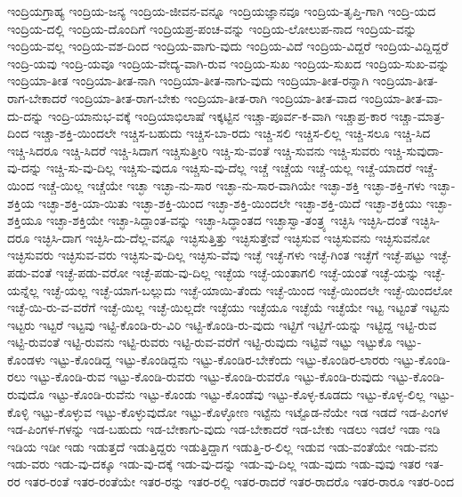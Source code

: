 {ಇಂದ್ರಿಯಗ್ರಾಹ್ಯ
ಇಂದ್ರಿಯ-ಜನ್ಯ
ಇಂದ್ರಿಯ-ಜೀವನ-ವನ್ನೂ
ಇಂದ್ರಿಯಜ್ಞಾನವೂ
ಇಂದ್ರಿಯ-ತೃಪ್ತಿ-ಗಾಗಿ
ಇಂದ್ರಿ-ಯದ
ಇಂದ್ರಿಯ-ದಲ್ಲಿ
ಇಂದ್ರಿಯ-ದೊಂದಿಗೆ
ಇಂದ್ರಿಯಪ್ರ-ಪಂಚ-ವನ್ನು
ಇಂದ್ರಿಯ-ಲೋಲುಪ-ನಾದ
ಇಂದ್ರಿಯ-ವನ್ನು
ಇಂದ್ರಿಯ-ವಲ್ಲ
ಇಂದ್ರಿಯ-ವಶ-ದಿಂದ
ಇಂದ್ರಿಯ-ವಾಗು-ವುದು
ಇಂದ್ರಿಯ-ವಿದೆ
ಇಂದ್ರಿಯ-ವಿದ್ದರೆ
ಇಂದ್ರಿಯ-ವಿದ್ದಿದ್ದರೆ
ಇಂದ್ರಿ-ಯವು
ಇಂದ್ರಿ-ಯವೂ
ಇಂದ್ರಿಯ-ವೇದ್ಯ-ವಾಗಿ-ರುವ
ಇಂದ್ರಿಯ-ಸುಖ
ಇಂದ್ರಿಯ-ಸುಖದ
ಇಂದ್ರಿಯ-ಸುಖ-ವನ್ನು
ಇಂದ್ರಿಯಾ-ತೀತ
ಇಂದ್ರಿಯಾ-ತೀತ-ನಾಗಿ
ಇಂದ್ರಿಯಾ-ತೀತ-ನಾಗು-ವುದು
ಇಂದ್ರಿಯಾ-ತೀತ-ರನ್ನಾಗಿ
ಇಂದ್ರಿಯಾ-ತೀತ-ರಾಗ-ಬೇಕಾದರೆ
ಇಂದ್ರಿಯಾ-ತೀತ-ರಾಗ-ಬೇಕು
ಇಂದ್ರಿಯಾ-ತೀತ-ರಾಗಿ
ಇಂದ್ರಿಯಾ-ತೀತ-ವಾದ
ಇಂದ್ರಿಯಾ-ತೀತ-ವಾ-ದು-ದನ್ನು
ಇಂದ್ರಿ-ಯಾನುಭ-ವಕ್ಕೆ
ಇಂದ್ರಿಯಾಭಿಲಾಷೆ
ಇಕ್ಕಟ್ಟಿನ
ಇಚ್ಚಾ-ಪೂರ್ವ-ಕ-ವಾಗಿ
ಇಚ್ಚಾಪ್ರ-ಕಾರ
ಇಚ್ಚಾ-ಮಾತ್ರ-ದಿಂದ
ಇಚ್ಚಾ-ಶಕ್ತಿ-ಯಿಂದಲೇ
ಇಚ್ಚಿಸ-ಬಹುದು
ಇಚ್ಚಿಸ-ಬಾ-ರದು
ಇಚ್ಚಿ-ಸಲಿ
ಇಚ್ಚಿಸ-ಲಿಲ್ಲ
ಇಚ್ಚಿ-ಸಲೂ
ಇಚ್ಚಿ-ಸಿದ
ಇಚ್ಚಿ-ಸಿದರೂ
ಇಚ್ಚಿ-ಸಿದರೆ
ಇಚ್ಚಿ-ಸಿದಾಗ
ಇಚ್ಚಿಸುತ್ತೀರಿ
ಇಚ್ಚಿ-ಸು-ವಂತೆ
ಇಚ್ಚಿ-ಸುವನು
ಇಚ್ಚಿ-ಸುವರು
ಇಚ್ಚಿ-ಸುವುದಾ-ವು-ದನ್ನು
ಇಚ್ಚಿ-ಸು-ವು-ದಿಲ್ಲ
ಇಚ್ಚಿಸು-ವುದೂ
ಇಚ್ಚಿಸು-ವು-ದೆಲ್ಲ
ಇಚ್ಚೆ
ಇಚ್ಚೆಯ
ಇಚ್ಚೆ-ಯಲ್ಲ
ಇಚ್ಚೆ-ಯಾದರೆ
ಇಚ್ಚೆ-ಯಿಂದ
ಇಚ್ಚೆ-ಯಿಲ್ಲ
ಇಚ್ಚೆಯೇ
ಇಚ್ಛಾ
ಇಚ್ಛಾ-ನು-ಸಾರ
ಇಚ್ಛಾ-ನು-ಸಾರ-ವಾಗಿಯೇ
ಇಚ್ಛಾ-ಶಕ್ತಿ
ಇಚ್ಛಾ-ಶಕ್ತಿ-ಗಳು
ಇಚ್ಛಾ-ಶಕ್ತಿಯ
ಇಚ್ಛಾ-ಶಕ್ತಿ-ಯಾ-ಯಿತು
ಇಚ್ಛಾ-ಶಕ್ತಿ-ಯಿಂದ
ಇಚ್ಛಾ-ಶಕ್ತಿ-ಯಿಂದಲೇ
ಇಚ್ಛಾ-ಶಕ್ತಿ-ಯಿದೆ
ಇಚ್ಛಾ-ಶಕ್ತಿಯು
ಇಚ್ಛಾ-ಶಕ್ತಿಯೂ
ಇಚ್ಛಾ-ಶಕ್ತಿಯೇ
ಇಚ್ಛಾ-ಸಿದ್ದಾಂತ-ವನ್ನು
ಇಚ್ಛಾ-ಸಿದ್ಧಾಂತದ
ಇಚ್ಛಾಸ್ವಾ-ತಂತ್ರ್ಯ
ಇಚ್ಛಿಸಿ
ಇಚ್ಛಿಸಿ-ದಂತೆ
ಇಚ್ಛಿಸಿ-ದರೂ
ಇಚ್ಛಿಸಿ-ದಾಗ
ಇಚ್ಛಿಸಿ-ದು-ದೆಲ್ಲ-ವನ್ನೂ
ಇಚ್ಛಿಸುತ್ತಿತ್ತು
ಇಚ್ಛಿಸುತ್ತೇವೆ
ಇಚ್ಛಿಸುವ
ಇಚ್ಛಿಸುವನು
ಇಚ್ಛಿಸುವನೋ
ಇಚ್ಛಿಸುವರು
ಇಚ್ಛಿಸುವ-ವರು
ಇಚ್ಛಿಸು-ವು-ದಿಲ್ಲ
ಇಚ್ಛಿಸು-ವೆವು
ಇಚ್ಛೆ
ಇಚ್ಛೆ-ಗಳು
ಇಚ್ಛೆ-ಗಿಂತ
ಇಚ್ಛೆಗೆ
ಇಚ್ಛೆ-ಪಟ್ಟು
ಇಚ್ಛೆ-ಪಡು-ವಂತೆ
ಇಚ್ಛೆ-ಪಡು-ವರೋ
ಇಚ್ಛೆ-ಪಡು-ವು-ದಿಲ್ಲ
ಇಚ್ಛೆಯ
ಇಚ್ಛೆ-ಯಂತಾಗಲಿ
ಇಚ್ಛೆ-ಯಂತೆ
ಇಚ್ಛೆ-ಯನ್ನು
ಇಚ್ಛೆ-ಯನ್ನೆಲ್ಲ
ಇಚ್ಛೆ-ಯಲ್ಲ
ಇಚ್ಛೆ-ಯಾಗ-ಬಲ್ಲುದು
ಇಚ್ಛೆ-ಯಾಯಿ-ತೆಂದು
ಇಚ್ಛೆ-ಯಿಂದ
ಇಚ್ಛೆ-ಯಿಂದಲೇ
ಇಚ್ಛೆ-ಯಿಂದಲೋ
ಇಚ್ಛೆ-ಯಿ-ರು-ವ-ವರೆಗೆ
ಇಚ್ಛೆ-ಯಿಲ್ಲ
ಇಚ್ಛೆ-ಯಿಲ್ಲದೇ
ಇಚ್ಛೆಯು
ಇಚ್ಛೆಯೂ
ಇಚ್ಛೆಯೆ
ಇಚ್ಛೆಯೇ
ಇಟ್ಟ
ಇಟ್ಟಂತೆ
ಇಟ್ಟನು
ಇಟ್ಟರು
ಇಟ್ಟರೆ
ಇಟ್ಟವು
ಇಟ್ಟಿ-ಕೊಂಡಿ-ರು-ವಿರಿ
ಇಟ್ಟಿ-ಕೊಂಡಿ-ರು-ವುದು
ಇಟ್ಟಿಗೆ
ಇಟ್ಟಿಗೆ-ಯನ್ನು
ಇಟ್ಟಿದ್ದ
ಇಟ್ಟಿ-ರುವ
ಇಟ್ಟಿ-ರುವಂತೆ
ಇಟ್ಟಿ-ರುವನು
ಇಟ್ಟಿ-ರುವರು
ಇಟ್ಟಿ-ರುವ-ವರೆಗೆ
ಇಟ್ಟಿ-ರುವುದು
ಇಟ್ಟಿವೆ
ಇಟ್ಟು
ಇಟ್ಟುಕೊ
ಇಟ್ಟು-ಕೊಂಡಳು
ಇಟ್ಟು-ಕೊಂಡಿದ್ದ
ಇಟ್ಟು-ಕೊಂಡಿದ್ದನು
ಇಟ್ಟು-ಕೊಂಡಿರ-ಬೇಕೆಂದು
ಇಟ್ಟು-ಕೊಂಡಿರ-ಲಾರರು
ಇಟ್ಟು-ಕೊಂಡಿ-ರಲು
ಇಟ್ಟು-ಕೊಂಡಿ-ರುವ
ಇಟ್ಟು-ಕೊಂಡಿ-ರುವರು
ಇಟ್ಟು-ಕೊಂಡಿ-ರುವರೊ
ಇಟ್ಟು-ಕೊಂಡಿ-ರುವುದು
ಇಟ್ಟು-ಕೊಂಡಿ-ರುವುದೊ
ಇಟ್ಟು-ಕೊಂಡಿ-ರುವೆನು
ಇಟ್ಟು-ಕೊಂಡು
ಇಟ್ಟು-ಕೊಂಡೆವು
ಇಟ್ಟು-ಕೊಳ್ಳ-ಕೂಡದು
ಇಟ್ಟು-ಕೊಳ್ಳ-ಲಿಲ್ಲ
ಇಟ್ಟು-ಕೊಳ್ಳಿ
ಇಟ್ಟು-ಕೊಳ್ಳುವ
ಇಟ್ಟು-ಕೊಳ್ಳುವುದೋ
ಇಟ್ಟು-ಕೊಳ್ಳೋಣ
ಇಟ್ಟೆನು
ಇಟ್ಟೊಡ-ನೆಯೇ
ಇಡ
ಇಡದೆ
ಇಡ-ಪಿಂಗಳ
ಇಡ-ಪಿಂಗಳ-ಗಳನ್ನು
ಇಡ-ಬಹುದು
ಇಡ-ಬೇಕಾಗು-ವುದು
ಇಡ-ಬೇಕಾದರೆ
ಇಡ-ಬೇಕು
ಇಡಲು
ಇಡಲೆ
ಇಡಾ
ಇಡಿ
ಇಡಿಯ
ಇಡೀ
ಇಡು
ಇಡುತ್ತದೆ
ಇಡುತ್ತಿದ್ದರು
ಇಡುತ್ತಿದ್ದಾಗ
ಇಡುತ್ತಿ-ರ-ಲಿಲ್ಲ
ಇಡುವ
ಇಡು-ವಂತೆಯೇ
ಇಡು-ವನು
ಇಡು-ವರು
ಇಡು-ವು-ದಕ್ಕೂ
ಇಡು-ವು-ದಕ್ಕೆ
ಇಡು-ವು-ದನ್ನು
ಇಡು-ವು-ದಿಲ್ಲ
ಇಡು-ವುದು
ಇಡು-ವುವು
ಇತರ
ಇತ-ರರ
ಇತರ-ರಂತೆ
ಇತರ-ರಂತೆಯೇ
ಇತರ-ರನ್ನು
ಇತರ-ರಲ್ಲಿ
ಇತರ-ರಾದರೆ
ಇತರ-ರಾದರೊ
ಇತರ-ರಾರೂ
ಇತರ-ರಿಂದ
}
